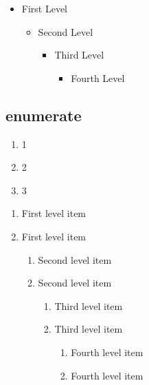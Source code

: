 \begin{itemize}
  \item  First Level
        \begin{itemize}
          \item  Second Level
                \begin{itemize}
                  \item  Third Level
                        \begin{itemize}
                          \item  Fourth Level
                        \end{itemize}
                \end{itemize}
        \end{itemize}
\end{itemize}

\subsection{enumerate}

\begin{enumerate}
  \item 1
  \item 2
  \item 3
\end{enumerate}

\begin{enumerate}
  \item First level item
  \item First level item
        \begin{enumerate}
          \item Second level item
          \item Second level item
                \begin{enumerate}
                  \item Third level item
                  \item Third level item
                        \begin{enumerate}
                          \item Fourth level item
                          \item Fourth level item
                        \end{enumerate}
                \end{enumerate}
        \end{enumerate}
\end{enumerate}


